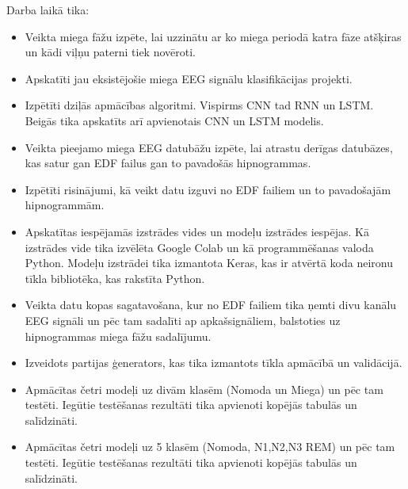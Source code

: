 \documentclass[12pt,paper=A4]{report}
\begin{document}
Darba laikā tika:
\begin{itemize}
\item Veikta miega fāžu izpēte, lai uzzinātu ar ko miega periodā katra fāze atšķiras un kādi viļņu paterni tiek novēroti. 
\item Apskatīti jau eksistējošie miega EEG signālu klasifikācijas projekti.
\item Izpētīti dziļās apmācības algoritmi. Vispirms CNN tad RNN un LSTM. Beigās tika apskatīts arī apvienotais CNN un LSTM modelis.
\item Veikta pieejamo miega EEG datubāžu izpēte, lai atrastu derīgas datubāzes, kas satur gan EDF failus gan to pavadošās hipnogrammas. 
\item Izpētīti risinājumi, kā veikt datu izguvi no EDF failiem un to pavadošajām hipnogrammām.
\item Apskatītas iespējamās izstrādes vides un modeļu izstrādes iespējas. Kā izstrādes vide tika izvēlēta Google Colab un kā programmēšanas valoda Python. Modeļu izstrādei tika izmantota Keras, kas ir atvērtā koda neironu tīkla bibliotēka, kas rakstīta Python.
\item Veikta datu kopas sagatavošana, kur no EDF failiem tika ņemti divu kanālu EEG signāli un pēc tam sadalīti ap apkašsignāliem, balstoties uz hipnogrammas miega fāžu sadalījumu.
\item Izveidots partijas ģenerators, kas tika izmantots tīkla apmācībā un validācijā.
\item Apmācītas četri modeļi uz divām klasēm (Nomoda un Miega) un pēc tam testēti. Iegūtie testēšanas rezultāti tika apvienoti kopējās tabulās un salīdzināti. 
\item Apmācītas četri modeļi uz 5 klasēm (Nomoda, N1,N2,N3 REM) un pēc tam testēti. Iegūtie testēšanas rezultāti tika apvienoti kopējās tabulās un salīdzināti. 
\
\end{itemize}
\end{document}
